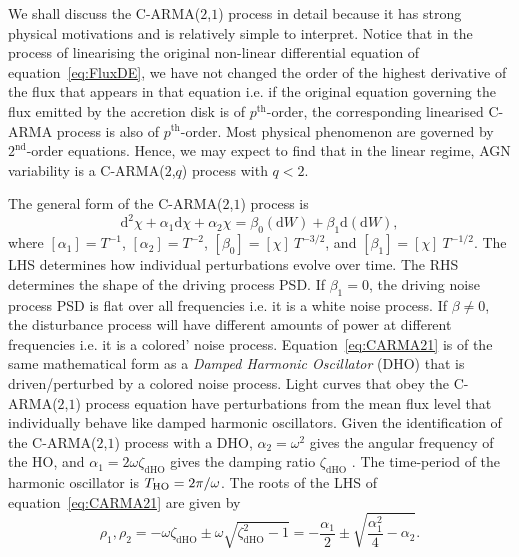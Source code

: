 \documentclass[a4paper,fleqn,usenatbib]{mnras}
\begin{document}
We shall discuss the C-ARMA($2$,$1$) process in detail because it has strong physical motivations and is relatively simple to interpret. Notice that in the process of linearising the original non-linear differential equation of equation~\eqref{eq:FluxDE}, we have not changed the order of the highest derivative of the flux that appears in that equation i.e. if the original equation governing the flux emitted by the accretion disk is of $p^{\mathrm{th}}$-order, the corresponding linearised C-ARMA process is also of $p^{\mathrm{th}}$-order. Most physical phenomenon are governed by $2^{\mathrm{nd}}$-order equations. Hence, we may expect to find that in the linear regime, AGN variability is a C-ARMA($2$,$q$) process with $q < 2$. 

The general form of the C-ARMA($2$,$1$) process is
\begin{equation}\label{eq:CARMA21}
\mathrm{d}^{2}\chi + \alpha_{1} \mathrm{d}\chi + \alpha_{2} \chi = \beta_{0}(\mathrm{d}W) + \beta_{1} \mathrm{d}(\mathrm{d}W),
\end{equation}
where $[\alpha_{1}] = T^{-1}$, $[\alpha_{2}] = T^{-2}$, $[\beta_{0}] = [\chi]~T^{-3/2}$, and $[\beta_{1}] = [\chi]~T^{-1/2}$. The LHS determines how individual perturbations evolve over time. The RHS determines the shape of the driving process PSD. If $\beta_{1} = 0$, the driving noise process PSD is flat over all frequencies i.e. it is a white noise process. If $\beta \neq 0$, the disturbance process will have different amounts of power at different frequencies i.e. it is a colored' noise process. Equation~\eqref{eq:CARMA21} is of the same mathematical form as a \textit{Damped Harmonic Oscillator} (DHO) that is driven/perturbed by a colored noise process. Light curves that obey the C-ARMA($2$,$1$) process equation have perturbations from the mean flux level that individually behave like damped harmonic oscillators.
Given the identification of the  C-ARMA($2$,$1$) process with a DHO, $\alpha_{2} = \omega^{2}$ gives the angular frequency of the HO, and $\alpha_{1} = 2\omega\zeta_{\mathrm{dHO}}$ gives the damping ratio $\zeta_{\mathrm{dHO}}$ \citep[see chapter~7 for notation]{PanditWu}. The time-period of the harmonic oscillator is $T_{\mathrm{HO}} = 2 \pi/\omega$. The roots of the LHS of equation~\eqref{eq:CARMA21} are given by
\begin{equation}\label{eq:CARMA21Roots}
\rho_{1},\rho_{2} = -\omega\zeta_{\mathrm{dHO}} \pm \omega \sqrt{\zeta_{\mathrm{dHO}}^{2} - 1} = -\frac{\alpha_{1}}{2} \pm \sqrt{\frac{\alpha_{1}^{2}}{4} - \alpha_{2}}.
\end{equation}
\end{document}
